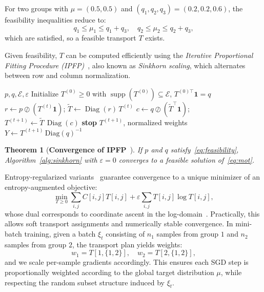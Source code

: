 \documentclass[9pt]{extarticle}
\newtheorem{theorem}{Theorem}
\theoremstyle{definition}
\renewcommand{\paragraph}[1]{\par\medskip\noindent{\bf #1}\hspace{0.5em}\ignorespaces}
\begin{document}
\paragraph{Example.}
For two groups with $\mu=(0.5,0.5)$ and $(q_1,q_2,q_3)=(0.2,0.2,0.6)$, the feasibility inequalities reduce to:
\[
q_1 \le \mu_1 \le q_1+q_3,\quad q_2 \le \mu_2 \le q_2+q_3,
\]
which are satisfied, so a feasible transport $T$ exists.

Given feasibility, $T$ can be computed efficiently using the \textit{Iterative Proportional Fitting Procedure (IPFP)}~\cite{sinkhorn1967concerning, knight2008sinkhorn}, also known as \textit{Sinkhorn scaling}, which alternates between row and column normalization.
\begin{algorithm}[h]
\caption{Sinkhorn Scaling for Masked Transport Map}
\label{alg:sinkhorn}
\begin{algorithmic}[1]
\Require $p,q,\mathcal{E},\varepsilon$
\State Initialize $T^{(0)}\ge0$ with $\operatorname{supp}(T^{(0)})\subseteq\mathcal{E}$, $T^{(0)\top}\mathbf{1}=q$
  \State $r \gets p \oslash (T^{(t)}\mathbf{1})$; \quad $\tilde T \gets \operatorname{Diag}(r)\,T^{(t)}$
  \State $c \gets q \oslash (\tilde T^\top\mathbf{1})$; \quad $T^{(t+1)} \gets \tilde T\,\operatorname{Diag}(c)$
   \textbf{stop}
  \EndIf
\EndFor
\State \Return $T^{(t+1)}$, normalized weights $Y \gets T^{(t+1)}\,\mathrm{Diag}(q)^{-1}$
\end{algorithmic}
\end{algorithm}
\begin{theorem}[\textbf{Convergence of IPFP}~\cite{sinkhorn1967concerning, knight2008sinkhorn}]
\label{thm:ipfp}
If $p$ and $q$ satisfy~\eqref{eq:feasibility}, Algorithm~\ref{alg:sinkhorn} with $\varepsilon=0$ converges to a feasible solution of~\eqref{eq:mot}.
\end{theorem}

Entropy-regularized variants~\cite{cuturi2013sinkhorn} guarantee convergence to a unique minimizer of an entropy-augmented objective:
\[
\min_{T\ge0} \sum_{i,j}C[i,j]T[i,j]+\varepsilon \sum_{i,j}T[i,j]\log T[i,j],
\]
whose dual corresponds to coordinate ascent in the log-domain~\cite{csiszar1975ipr}. Practically, this allows soft transport assignments and numerically stable convergence.
In mini-batch training, given a batch $\xi_t$ consisting of $n_1$ samples from group $1$ and $n_2$ samples from group $2$, the transport plan yields weights:
\[
w_1 = T[1,\{1,2\}], \quad w_2 = T[2,\{1,2\}],
\]
and we scale per-sample gradients accordingly. This ensures each SGD step is proportionally weighted according to the global target distribution $\mu$, while respecting the random subset structure induced by $\xi_t$.
\end{document}
